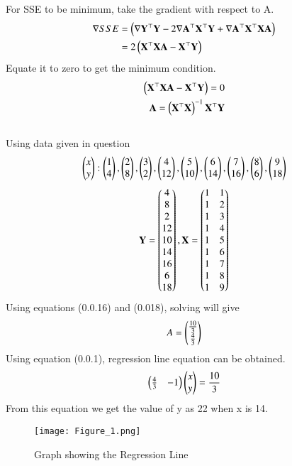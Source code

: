 \documentclass[journal,12pt,twocolumn]{IEEEtran}
\begin{document}
For SSE to be minimum, take the gradient with respect to A.
\begin{align}
      	 \nabla
      		SSE
      		&=\left(\nabla\mathbf{Y}^{\top}\mathbf{Y}-2\nabla\mathbf{A}^{\top}\mathbf{X}^{\top}\mathbf{Y}+\nabla\mathbf{A}^{\top}\mathbf{X}^{\top}\mathbf{X}\mathbf{A}\right)\\
      		&=2\left(\mathbf{X}^{\top}\mathbf{X}\mathbf{A}-\mathbf{X}^{\top}\mathbf{Y}\right)
\end{align}
Equate it to zero to get the minimum condition.
\begin{align}
       \left(\mathbf{X}^{\top}\mathbf{X}\mathbf{A}-\mathbf{X}^{\top}\mathbf{Y}\right)=0\\
       \mathbf{A}=\left(\mathbf{X}^{\top}\mathbf{X}\right)^{-1}\mathbf{X}^{\top}\mathbf{Y}
\end{align}\\
Using data given in question\\
\begin{align}
	\begin{pmatrix}x \\y \end{pmatrix}:
	\begin{pmatrix}1 \\4 \end{pmatrix},
	\begin{pmatrix}2 \\8 \end{pmatrix},
	\begin{pmatrix}3 \\2 \end{pmatrix},
    \begin{pmatrix}4 \\12 \end{pmatrix},
    \begin{pmatrix}5 \\10 \end{pmatrix},
    \begin{pmatrix}6 \\14 \end{pmatrix},
    \begin{pmatrix}7 \\16 \end{pmatrix},
    \begin{pmatrix}8 \\6 \end{pmatrix},
    \begin{pmatrix}9 \\18 \end{pmatrix}
\end{align}
\begin{align}
	\mathbf{Y}=\begin{pmatrix}4\\8\\2\\12\\10\\14\\16\\6\\18\end{pmatrix},
	\mathbf{X}=\begin{pmatrix}1&1\\1&2\\1&3\\1&4\\1&5\\1&6\\1&7\\1&8\\1&9\end{pmatrix}
\end{align}
Using equations (0.0.16) and (0.018), solving will give
\begin{align}
	A=\begin{pmatrix}\frac{10}{3}\\\frac{4}{3}\end{pmatrix}
\end{align}
Using equation (0.0.1), regression line equation can be obtained.
\begin{align}
    \begin{pmatrix}\frac{4}{3} & -1\end{pmatrix}\begin{pmatrix}x\\y\end{pmatrix}= \frac{10}{3}
\end{align}
From this equation we get the value of y as 22 when x is 14.\\
\begin{figure}[ht]
    \centering
    \texttt{[image: Figure\_1.png]}
    \caption{Graph showing the Regression Line}
    \label{Figure_1}
\end{figure}\\
\end{document}
